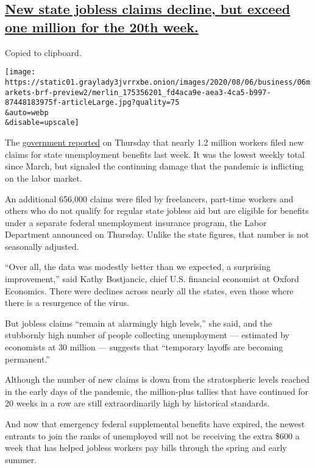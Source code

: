 \hypertarget{new-state-jobless-claims-decline-but-exceed-one-million-for-the-20th-week}{%
\subsection{\texorpdfstring{\protect\hyperlink{new-state-jobless-claims-decline-but-exceed-one-million-for-the-20th-week}{New
state jobless claims decline, but exceed one million for the 20th
week.}}{New state jobless claims decline, but exceed one million for the 20th week.}}\label{new-state-jobless-claims-decline-but-exceed-one-million-for-the-20th-week}}

Copied to clipboard.

\texttt{[image: https://static01.graylady3jvrrxbe.onion/images/2020/08/06/business/06markets-brf-preview2/merlin\_175356201\_fd4aca9e-aea3-4ca5-b997-87448183975f-articleLarge.jpg?quality=75\\\&auto=webp\\\&disable=upscale]}

The \href{https://oui.doleta.gov/press/2020/080620.pdf}{government
reported} on Thursday that nearly 1.2 million workers filed new claims
for state unemployment benefits last week. It was the lowest weekly
total since March, but signaled the continuing damage that the pandemic
is inflicting on the labor market.

An additional 656,000 claims were filed by freelancers, part-time
workers and others who do not qualify for regular state jobless aid but
are eligible for benefits under a separate federal unemployment
insurance program, the Labor Department announced on Thursday. Unlike
the state figures, that number is not seasonally adjusted.

``Over all, the data was modestly better than we expected, a surprising
improvement,'' said Kathy Bostjancic, chief U.S. financial economist at
Oxford Economics. There were declines across nearly all the states, even
those where there is a resurgence of the virus.

But jobless claims ``remain at alarmingly high levels,'' she said, and
the stubbornly high number of people collecting unemployment ---
estimated by economists at 30 million --- suggests that ``temporary
layoffs are becoming permanent.''

Although the number of new claims is down from the stratospheric levels
reached in the early days of the pandemic, the million-plus tallies that
have continued for 20 weeks in a row are still extraordinarily high by
historical standards.

And now that emergency federal supplemental benefits have expired, the
newest entrants to join the ranks of unemployed will not be receiving
the extra \$600 a week that has helped jobless workers pay bills through
the spring and early summer.

